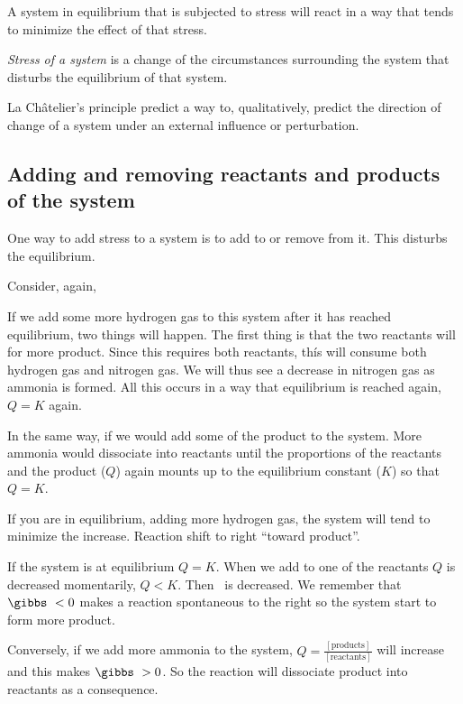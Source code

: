 \documentclass[../mit-general-chemistry.tex]{subfiles}
\begin{document}
\begin{definition}
  A system in equilibrium that is subjected to stress will react in a
  way that tends to minimize the effect of that stress.
\end{definition}

{\em Stress of a system} is a change of the circumstances surrounding
the system that disturbs the equilibrium of that system.

La Châtelier's principle predict a way to, qualitatively, predict the
direction of change of a system under an external influence or
perturbation.






\subsection{Adding and removing reactants and products of the system}


One way to add stress to a system is to add to or remove from it. This
disturbs the equilibrium.

Consider, again,

If we add some more hydrogen gas to this system after it has reached
equilibrium, two things will happen. The first thing is that the two
reactants will for more product. Since this requires both reactants,
thís will consume both hydrogen gas and nitrogen gas. We will thus see
a decrease in nitrogen gas as ammonia is formed. All this occurs in a
way that equilibrium is reached again, $Q = K$ again.

In the same way, if we would add some of the product to the
system. More ammonia would dissociate into reactants until the
proportions of the reactants and the product ($Q$) again mounts up to
the equilibrium constant ($K$) so that $Q = K$.

If you are in equilibrium, adding more hydrogen gas, the system will
tend to minimize the increase. Reaction shift to right ``toward
product''.

If the system is at equilibrium $Q = K$. When we add to one of the
reactants $Q$ is decreased momentarily, $Q < K$. Then \gibbs\ is
decreased. We remember that $\gibbs\ < 0$ makes a reaction spontaneous
to the right so the system start to form more product.

Conversely, if we add more ammonia to the system, $Q =
\frac{[\text{products}]}{[\text{reactants}]}$ will increase and this
makes $\gibbs\ > 0$. So the reaction will dissociate product into
reactants as a consequence.
\end{document}
